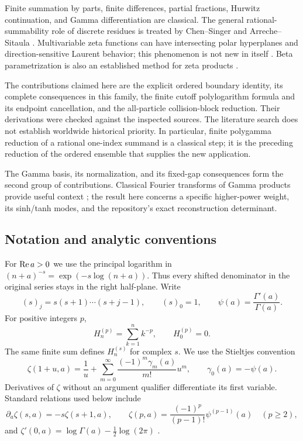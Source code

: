 Finite summation by parts, finite differences, partial fractions,
Hurwitz continuation, and Gamma differentiation are classical.
The general rational-summability role of discrete residues is treated
by Chen--Singer and Arreche--Sitaula \cite{chen-singer,arreche-sitaula}.
Multivariable zeta functions can have intersecting polar hyperplanes
and direction-sensitive Laurent behavior; this phenomenon is not new
in itself \cite{matsumoto-ono-wakabayashi}. Beta parametrization is also
an established method for zeta products \cite{shpot-paris}.

The contributions claimed here are the explicit ordered boundary
identity, its complete consequences in this family, the finite cutoff
polylogarithm formula and its endpoint cancellation, and the
all-particle collision-block reduction. Their derivations were checked
against the inspected sources. The literature search does not establish
worldwide historical priority. In particular, finite polygamma
reduction of a rational one-index summand is a classical step; it is
the preceding reduction of the ordered ensemble that supplies the
new application.

The Gamma basis, its normalization, and its fixed-gap consequences form
the second group of contributions. Classical Fourier transforms of
Gamma products provide useful context \cite{ramanujan-transform};
the result here concerns a specific higher-power weight, its
sinh/tanh modes, and the repository's exact reconstruction determinant.

\subsection{Notation and analytic conventions}

For $\operatorname{Re} a>0$ we use the principal logarithm in
$(n+a)^{-s}=\exp(-s\log(n+a))$. Thus every shifted denominator in
the original series stays in the right half-plane. Write
\[
 (s)_j=s(s+1)\cdots(s+j-1),\qquad (s)_0=1,
 \qquad \psi(a)=\frac{\Gamma'(a)}{\Gamma(a)}.
\]
For positive integers $p$,
\[
 H_n^{(p)}=\sum_{k=1}^{n}k^{-p},\qquad H_0^{(p)}=0.
\]
The same finite sum defines $H_n^{(s)}$ for complex $s$.
We use the Stieltjes convention
\begin{equation}\label{eq:stieltjes-convention}
 \zeta(1+u,a)=\frac1u+
    \sum_{m=0}^{\infty}\frac{(-1)^m\gamma_m(a)}{m!}u^m,
 \qquad \gamma_0(a)=-\psi(a).
\end{equation}
Derivatives of $\zeta$ without an argument qualifier differentiate its
first variable. Standard relations used below include
\begin{equation}\label{eq:classical-ladders}
 \partial_a\zeta(s,a)=-s\zeta(s+1,a),\qquad
 \zeta(p,a)=\frac{(-1)^p}{(p-1)!}\psi^{(p-1)}(a)\quad(p\ge2),
\end{equation}
and $\zeta'(0,a)=\log\Gamma(a)-\tfrac12\log(2\pi)$
\cite{dlmf:hurwitz,dlmf:gamma}.

